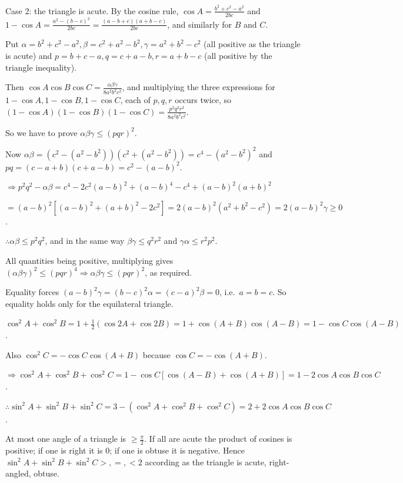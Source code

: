   Case 2: the triangle is acute. By the cosine rule, $\cos A = \frac{b^2 + c^2 - a^2}{2bc}$ and $1 - \cos A
  = \frac{a^2 - (b - c)^2}{2bc} = \frac{(a - b + c)(a + b - c)}{2bc}$, and similarly for $B$ and $C$.

  Put $\alpha = b^2 + c^2 - a^2, \beta = c^2 + a^2 - b^2, \gamma = a^2 + b^2 - c^2$ (all positive as the
  triangle is acute) and $p = b + c - a, q = c + a - b, r = a + b - c$ (all positive by the triangle
  inequality).

  Then $\cos A\cos B\cos C = \frac{\alpha\beta\gamma}{8a^2b^2c^2}$, and multiplying the three expressions
  for $1 - \cos A, 1 - \cos B, 1 - \cos C$, each of $p, q, r$ occurs twice, so $(1 - \cos A)(1 - \cos B)(1 -
  \cos C) = \frac{p^2q^2r^2}{8a^2b^2c^2}$.

  So we have to prove $\alpha\beta\gamma\leq(pqr)^2$.

  Now $\alpha\beta = \left(c^2 - (a^2 - b^2)\right)\left(c^2 + (a^2 - b^2)\right) = c^4 - (a^2 - b^2)^2$ and
  $pq = (c - a + b)(c + a - b) = c^2 - (a - b)^2$.

  $\Rightarrow p^2q^2 - \alpha\beta = c^4 - 2c^2(a - b)^2 + (a - b)^4 - c^4 + (a - b)^2(a + b)^2$

  $= (a - b)^2\left[(a - b)^2 + (a + b)^2 - 2c^2\right] = 2(a - b)^2(a^2 + b^2 - c^2) = 2(a -
  b)^2\gamma\geq 0$.

  $\therefore\alpha\beta\leq p^2q^2$, and in the same way $\beta\gamma\leq q^2r^2$ and $\gamma\alpha\leq
  r^2p^2$.

  All quantities being positive, multiplying gives $(\alpha\beta\gamma)^2\leq(pqr)^4\Rightarrow
  \alpha\beta\gamma\leq(pqr)^2$, as required.

  Equality forces $(a - b)^2\gamma = (b - c)^2\alpha = (c - a)^2\beta = 0$, i.e.\ $a = b = c$. So equality
  holds only for the equilateral triangle.
\item $\cos^2A + \cos^2B = 1 + \frac{1}{2}(\cos2A + \cos2B) = 1 + \cos(A + B)\cos(A - B) = 1 - \cos
  C\cos(A - B)$.

  Also $\cos^2C = -\cos C\cos(A + B)$ because $\cos C = -\cos(A + B)$.

  $\Rightarrow\cos^2A + \cos^2B + \cos^2C = 1 - \cos C\left[\cos(A - B) + \cos(A + B)\right] = 1 - 2\cos A\cos
  B\cos C$.

  $\therefore\sin^2A + \sin^2B + \sin^2C = 3 - (\cos^2A + \cos^2B + \cos^2C) = 2 + 2\cos A\cos B\cos C$.

  At most one angle of a triangle is $\geq\frac{\pi}{2}$. If all are acute the product of cosines is
  positive; if one is right it is $0$; if one is obtuse it is negative. Hence $\sin^2A + \sin^2B
  + \sin^2C >, =, < 2$ according as the triangle is acute, right-angled, obtuse.

